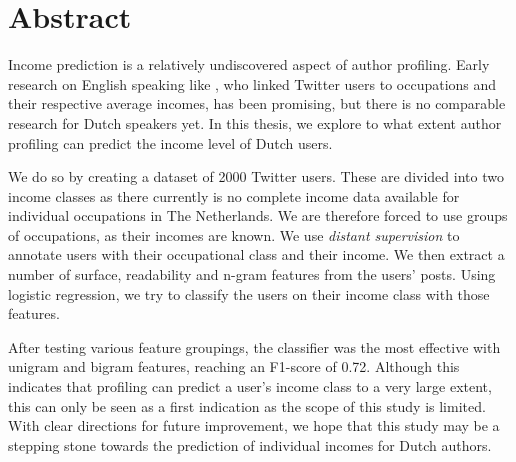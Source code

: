 \documentclass[
10pt, %
a4paper, %
oneside, %
headinclude,footinclude, %
] {book}%
\begin{document}

\chapter*{Abstract}
Income prediction is a relatively undiscovered aspect of author profiling. Early research on English speaking like \citet{flekova}, who linked Twitter users  to occupations and their respective average incomes, has been promising, but there is no comparable research for Dutch speakers yet. In this thesis, we explore to what extent author profiling can predict the income level of Dutch users.

We do so by creating a dataset of 2000 Twitter users. These are divided into two income classes as there currently is no complete income data available for individual occupations in The Netherlands.  We are therefore forced to use groups of occupations, as their incomes are known. We use \textit{distant supervision} to annotate users with their occupational class and their income. We then extract a number of surface, readability and n-gram features from the users' posts. Using logistic regression, we try to classify the users on their income class with those features.

After testing various feature groupings, the classifier was the most effective with unigram and bigram features, reaching an F1-score of 0.72. Although this indicates that  profiling can predict a user's income class to a very large extent, this can only be seen as a first indication as the scope of this study is limited. With clear directions for future improvement, we hope that this study may be a stepping stone towards the prediction of individual incomes for Dutch authors.

\clearpage
\setcounter{tocdepth}{3} %
\tableofcontents %

\end{document}
